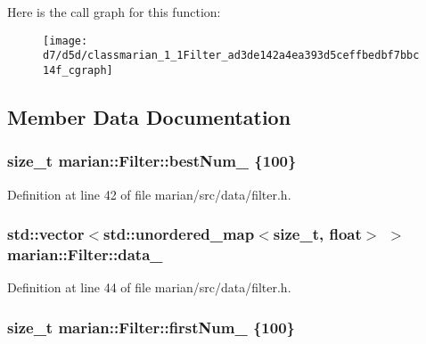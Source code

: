 Here is the call graph for this function\+:
\nopagebreak
\begin{figure}[H]
\begin{center}
\leavevmode
\texttt{[image: d7/d5d/classmarian\_1\_1Filter\_ad3de142a4ea393d5ceffbedbf7bbc14f\_cgraph]}
\end{center}
\end{figure}




\subsection{Member Data Documentation}
\subsubsection[{\texorpdfstring{best\+Num\+\_\+}{bestNum_}}]{\setlength{\rightskip}{0pt plus 5cm}size\+\_\+t marian\+::\+Filter\+::best\+Num\+\_\+ \{100\}\hspace{0.3cm}{\ttfamily [private]}}\hypertarget{classmarian_1_1Filter_a31bcefb59cbae4752b1e50b682631945}{}\label{classmarian_1_1Filter_a31bcefb59cbae4752b1e50b682631945}


Definition at line 42 of file marian/src/data/filter.\+h.

\subsubsection[{\texorpdfstring{data\+\_\+}{data_}}]{\setlength{\rightskip}{0pt plus 5cm}std\+::vector$<$std\+::unordered\+\_\+map$<$size\+\_\+t, float$>$ $>$ marian\+::\+Filter\+::data\+\_\+\hspace{0.3cm}{\ttfamily [private]}}\hypertarget{classmarian_1_1Filter_aad459e8cec49017a0d60e158bdd4b8e6}{}\label{classmarian_1_1Filter_aad459e8cec49017a0d60e158bdd4b8e6}


Definition at line 44 of file marian/src/data/filter.\+h.

\subsubsection[{\texorpdfstring{first\+Num\+\_\+}{firstNum_}}]{\setlength{\rightskip}{0pt plus 5cm}size\+\_\+t marian\+::\+Filter\+::first\+Num\+\_\+ \{100\}\hspace{0.3cm}{\ttfamily [private]}}\hypertarget{classmarian_1_1Filter_ae7cffff59aba67252377a48d9f3b4bc4}{}\label{classmarian_1_1Filter_ae7cffff59aba67252377a48d9f3b4bc4}


